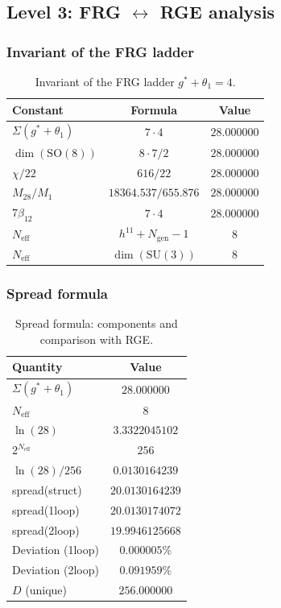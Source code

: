 \documentclass[11pt,a4paper]{article}
\newcommand{\SU}{\ensuremath{\mathrm{SU}}}
\newcommand{\SO}{\ensuremath{\mathrm{SO}}}
\theoremstyle{definition}
\begin{document}
\subsection{Level 3: FRG \texorpdfstring{$\leftrightarrow$}{} RGE analysis}
\label{app:level-3-frg}

\subsubsection{Invariant of the FRG ladder}

\begin{table}[ht]
\centering
\caption{Invariant of the FRG ladder \texorpdfstring{$g^* + \theta_1 = 4$}{g^* + \_1 = 4}.}
\label{tab:app-invariant}
\begin{tabular}{lcc}
\toprule
Constant & Formula & Value \\
\midrule
$\Sigma(g^*+\theta_1)$ & $7 \cdot 4$ & $28.000000$ \\
$\dim(\SO(8))$ & $8 \cdot 7/2$ & $28.000000$ \\
$\chi/22$ & $616/22$ & $28.000000$ \\
$M_{28}/M_1$ & $18364.537/655.876$ & $28.000000$ \\
$7\beta_{12}$ & $7 \cdot 4$ & $28.000000$ \\
\midrule
$N_{\text{eff}}$ & $h^{11} + N_{\text{gen}} - 1$ & $8$ \\
$N_{\text{eff}}$ & $\dim(\SU(3))$ & $8$ \\
\bottomrule
\end{tabular}
\end{table}

\subsubsection{Spread formula}

\begin{table}[ht]
\centering
\caption{Spread formula: components and comparison with RGE.}
\label{tab:app-spread}
\begin{tabular}{lc}
\toprule
Quantity & Value \\
\midrule
$\Sigma(g^*+\theta_1)$ & $28.000000$ \\
$N_{\text{eff}}$ & $8$ \\
$\ln(28)$ & $3.3322045102$ \\
$2^{N_{\text{eff}}}$ & $256$ \\
$\ln(28)/256$ & $0.0130164239$ \\
\midrule
spread(struct) & $20.0130164239$ \\
spread(1loop) & $20.0130174072$ \\
spread(2loop) & $19.9946125668$ \\
\midrule
Deviation (1loop) & $0.000005\%$ \\
Deviation (2loop) & $0.091959\%$ \\
$D$ (unique) & $256.000000$ \\
\bottomrule
\end{tabular}
\end{table}
\end{document}
